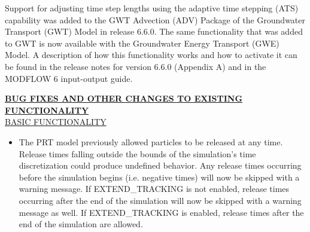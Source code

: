 	
\item \currentmodflowversion
	
	\item Support for adjusting time step lengths using the adaptive time stepping (ATS) capability was added to the GWT Advection (ADV) Package of the Groundwater Transport (GWT) Model in release 6.6.0.  The same functionality that was added to GWT is now available with the Groundwater Energy Transport (GWE) Model.  A description of how this functionality works and how to activate it can be found in the release notes for version 6.6.0 (Appendix A) and in the MODFLOW 6 input-output guide.


\textbf{\underline{BUG FIXES AND OTHER CHANGES TO EXISTING FUNCTIONALITY}} \\
\underline{BASIC FUNCTIONALITY}
\begin{itemize}
	\item The PRT model previously allowed particles to be released at any time. Release times falling outside the bounds of the simulation's time discretization could produce undefined behavior. Any release times occurring before the simulation begins (i.e. negative times) will now be skipped with a warning message. If EXTEND\_TRACKING is not enabled, release times occurring after the end of the simulation will now be skipped with a warning message as well. If EXTEND\_TRACKING is enabled, release times after the end of the simulation are allowed.
\end{itemize}


